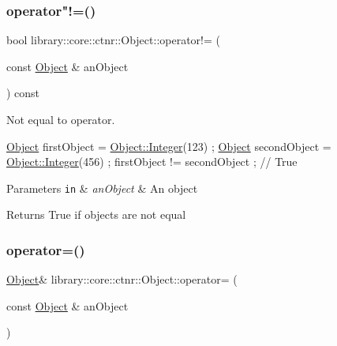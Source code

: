 \subsubsection{\texorpdfstring{operator"!=()}{operator!=()}}
{\footnotesize\ttfamily bool library\+::core\+::ctnr\+::\+Object\+::operator!= (\begin{DoxyParamCaption}\item[{const \hyperlink{classlibrary_1_1core_1_1ctnr_1_1_object}{Object} \&}]{an\+Object }\end{DoxyParamCaption}) const}



Not equal to operator. 


\begin{DoxyCode}
\hyperlink{classlibrary_1_1core_1_1ctnr_1_1_object_a51bb72dec3a1b2738e0ad92b977b8d8d}{Object} firstObject = \hyperlink{classlibrary_1_1core_1_1ctnr_1_1_object_a6746a69f0507b2c7ad8ebdf3d873b083}{Object::Integer}(123) ;
\hyperlink{classlibrary_1_1core_1_1ctnr_1_1_object_a51bb72dec3a1b2738e0ad92b977b8d8d}{Object} secondObject = \hyperlink{classlibrary_1_1core_1_1ctnr_1_1_object_a6746a69f0507b2c7ad8ebdf3d873b083}{Object::Integer}(456) ;
firstObject != secondObject ; \textcolor{comment}{// True}
\end{DoxyCode}



\begin{DoxyParams}[1]{Parameters}
\mbox{\tt in}  & {\em an\+Object} & An object \\
\hline
\end{DoxyParams}
\begin{DoxyReturn}{Returns}
True if objects are not equal 
\end{DoxyReturn}
\mbox{\label{classlibrary_1_1core_1_1ctnr_1_1_object_acbc5a6b4e2971d1cb977867d086832fe}} 
\subsubsection{\texorpdfstring{operator=()}{operator=()}}
{\footnotesize\ttfamily \hyperlink{classlibrary_1_1core_1_1ctnr_1_1_object}{Object}\& library\+::core\+::ctnr\+::\+Object\+::operator= (\begin{DoxyParamCaption}\item[{const \hyperlink{classlibrary_1_1core_1_1ctnr_1_1_object}{Object} \&}]{an\+Object }\end{DoxyParamCaption})}



